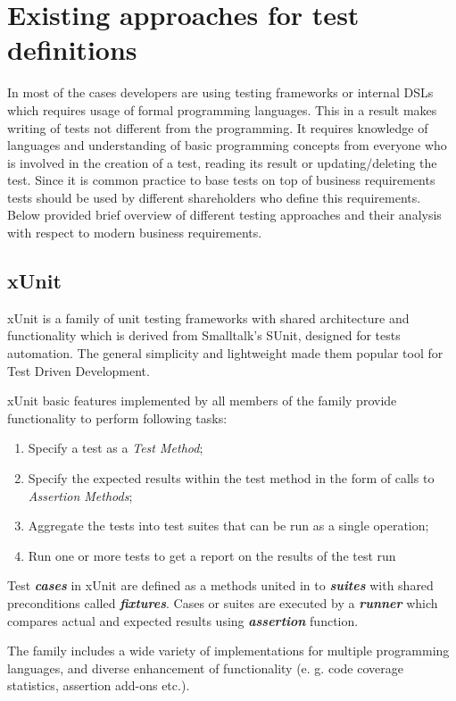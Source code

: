 \section{Existing approaches for test definitions}
In most of the cases developers are using testing frameworks or internal DSLs which requires usage of formal programming languages. This in a result makes writing of tests not different from the programming. It requires knowledge of languages and understanding of basic programming concepts from everyone who is involved in the creation of a test, reading its result or updating/deleting the test.
Since it is common practice to base tests on top of business requirements tests should be used by different shareholders who define this requirements.
Below provided brief overview of different testing approaches and their analysis with respect to modern business requirements.

\subsection{xUnit}
xUnit is a family of unit testing frameworks with shared architecture and functionality which is derived from Smalltalk's SUnit, designed for tests automation\cite{xunit}\cite{xunitFowler}. The general simplicity and lightweight made them popular tool for Test Driven Development\cite{xunitFowler}.

xUnit basic features implemented by all members of the family provide functionality to perform following tasks\cite{xunit}:
\begin{enumerate}
	\item Specify a test as a \textit{Test Method};
	\item Specify the expected results within the test method in the form of calls to \textit{Assertion Methods};
	\item Aggregate the tests into test suites that can be run as a single operation;
	\item Run one or more tests to get a report on the results of the test run
\end{enumerate}

Test \textbf{\textit{cases}} in xUnit are defined as a methods united in to \textbf{\textit{suites}} with shared preconditions called \textbf{\textit{fixtures}}.  Cases or suites are executed by a \textbf{\textit{runner}} which compares actual and expected results using \textbf{\textit{assertion}} function.

The family includes a wide variety of implementations for multiple programming languages, and diverse enhancement of functionality (e. g. code coverage statistics, assertion add-ons etc.)\cite{xunitWiki}.

